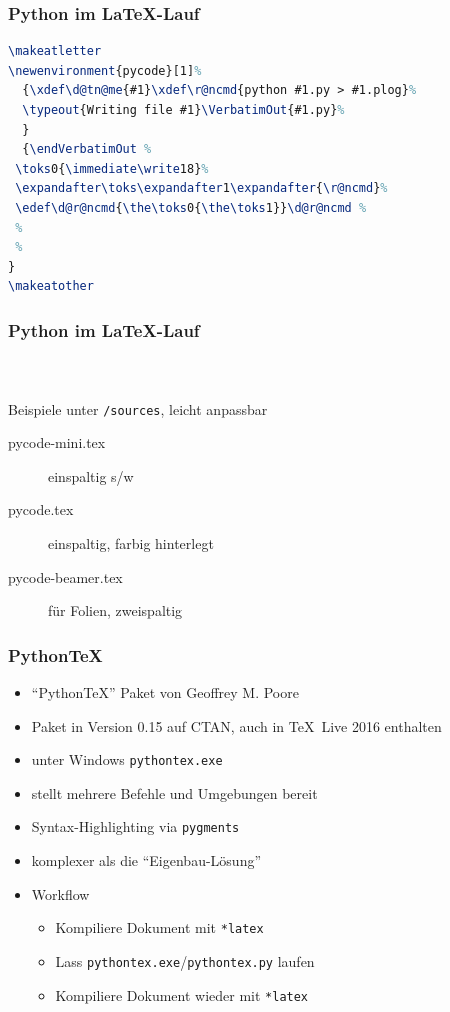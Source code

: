 \documentclass[12pt,ngerman]{beamer}
\begin{document}
\begin{frame}[fragile]
\frametitle{Python im \LaTeX-Lauf}

\begin{lstlisting}[basicstyle={\ttfamily\footnotesize},language={TeX},morekeywords={makeatletter,endVerbatimOut,typeout,lstinputlisting,makeatother,VerbatimOut,footnotesize}]
\makeatletter
\newenvironment{pycode}[1]%
  {\xdef\d@tn@me{#1}\xdef\r@ncmd{python #1.py > #1.plog}%
  \typeout{Writing file #1}\VerbatimOut{#1.py}% 
  }
  {\endVerbatimOut %
 \toks0{\immediate\write18}%
 \expandafter\toks\expandafter1\expandafter{\r@ncmd}%
 \edef\d@r@ncmd{\the\toks0{\the\toks1}}\d@r@ncmd %
 %
 %
}
\makeatother
\end{lstlisting}
\end{frame}

\begin{frame}
\frametitle{Python im \LaTeX-Lauf}
\framesubtitle{~}

Beispiele unter \texttt{/sources}, leicht anpassbar

\begin{description}
\item [pycode-mini.tex] einspaltig s/w
\item [pycode.tex] einspaltig, farbig hinterlegt
\item [pycode-beamer.tex] für Folien, zweispaltig
\end{description}
\end{frame}



\begin{frame}
\frametitle{Python\TeX}

\begin{itemize}
\item \enquote{PythonTeX} Paket von Ge­of­frey M. Poore
\item Paket in Version 0.15 auf CTAN, auch in \newline \TeX~Live 2016 enthalten
\item unter Windows \texttt{pythontex.exe}
\item stellt mehrere Befehle und Umgebungen bereit
\item Syntax-Highlighting via \texttt{pygments}
\item komplexer als die \enquote{Eigenbau-Lösung} 
\item Workflow
\begin{itemize}
	\item Kompiliere Dokument mit \texttt{*latex}
	\item Lass \texttt{pythontex.exe}/\texttt{pythontex.py} laufen
	\item Kompiliere Dokument wieder mit \texttt{*latex}
\end{itemize}

\end{itemize}
\end{frame}
\end{document}

